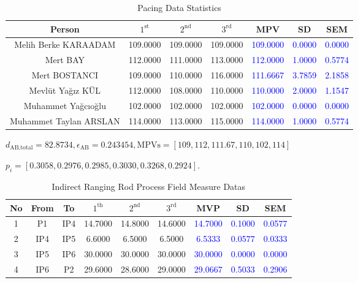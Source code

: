 \documentclass[12pt]{article}
\begin{document}
\begin{table}[ht!]
\centering
\begin{tabular}{ccccccc}
\hline
Person & $1^{\text{st}}$ & $2^{\text{nd}}$ & $3^{\text{rd}}$ & MPV & SD & SEM \\
\hline
Melih Berke KARAADAM & 109.0000 & 109.0000 & 109.0000 & \textcolor{blue}{109.0000} & \textcolor{blue}{0.0000} & \textcolor{blue}{0.0000} \\
Mert BAY & 112.0000 & 111.0000 & 113.0000 & \textcolor{blue}{112.0000} & \textcolor{blue}{1.0000} & \textcolor{blue}{0.5774} \\
Mert BOSTANCI & 109.0000 & 110.0000 & 116.0000 & \textcolor{blue}{111.6667} & \textcolor{blue}{3.7859} & \textcolor{blue}{2.1858} \\
Mevlüt Yağız KÜL & 112.0000 & 108.0000 & 110.0000 & \textcolor{blue}{110.0000} & \textcolor{blue}{2.0000} & \textcolor{blue}{1.1547} \\
Muhammet Yağcıoğlu & 102.0000 & 102.0000 & 102.0000 & \textcolor{blue}{102.0000} & \textcolor{blue}{0.0000} & \textcolor{blue}{0.0000} \\
Muhammet Taylan ARSLAN & 114.0000 & 113.0000 & 115.0000 & \textcolor{blue}{114.0000} & \textcolor{blue}{1.0000} & \textcolor{blue}{0.5774} \\
\hline
\end{tabular}
\caption{Pacing Data Statistics}
\end{table}


\begin{center}
$\boxed{d_{\text{AB,total}} = 82.8734}, \boxed{\epsilon_{\text{AB}} =  0.243454},\boxed{\text{MPVs} =[109, 112, 111.67, 110, 102, 114]}$

$\boxed{p_i= [0.3058, 0.2976, 0.2985, 0.3030, 0.3268, 0.2924]}.$
\end{center}



\begin{table}[ht!]
\centering
\begin{tabular}{ccccccccc}
\hline
No & From & To  & $1^{\operatorname{th}}$  & $2^{\operatorname{nd}}$  & $3^{\operatorname{rd}}$   & MVP & SD & SEM \\
\hline
1 & P1 & IP4 & 14.7000 & 14.8000 & 14.6000 & \textcolor{blue}{14.7000} & \textcolor{blue}{0.1000} & \textcolor{blue}{0.0577} \\
2 & IP4 & IP5 & 6.6000 & 6.5000 & 6.5000 & \textcolor{blue}{6.5333} & \textcolor{blue}{0.0577} & \textcolor{blue}{0.0333} \\
3 & IP5 & IP6 & 30.0000 & 30.0000 & 30.0000 & \textcolor{blue}{30.0000} & \textcolor{blue}{0.0000} & \textcolor{blue}{0.0000} \\
4 & IP6 & P2 & 29.6000 & 28.6000 & 29.0000 & \textcolor{blue}{29.0667} & \textcolor{blue}{0.5033} & \textcolor{blue}{0.2906} \\
\hline
\end{tabular}
\caption{Indirect Ranging Rod Process Field Measure Datas} 
\end{table}
\end{document}
